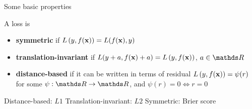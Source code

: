 \documentclass[11pt,compress,t,notes=noshow, xcolor=table]{beamer}
\begin{document}
\begin{frame}{Some basic properties}

A loss is  
\begin{itemize}
  \item \textbf{symmetric} if $L\left(y, f(\mathbf{x})\right) = L(f(\mathbf{x}), y)$
  \item \textbf{translation-invariant} if $L(y + a, f(\mathbf{x}) + a) = L\left(y, f(\mathbf{x})\right)$, 
  $a \in \R$
  \item \textbf{distance-based} if it can be written in terms of residual 
    $L\left(y, f(\mathbf{x})\right) = \psi (r)$ for some $\psi: \R \to \R$, and 
    $\psi(r) = 0 \Leftrightarrow r = 0$
 \end{itemize}


\vfill

\splitVThree
{
  \tiny \centering
  Distance-based: $L1$
}%
{
  \tiny \centering
  Translation-invariant: $L2$
}%
{
  \tiny \centering
  Symmetric: Brier score
}

\end{frame}

\end{document}
